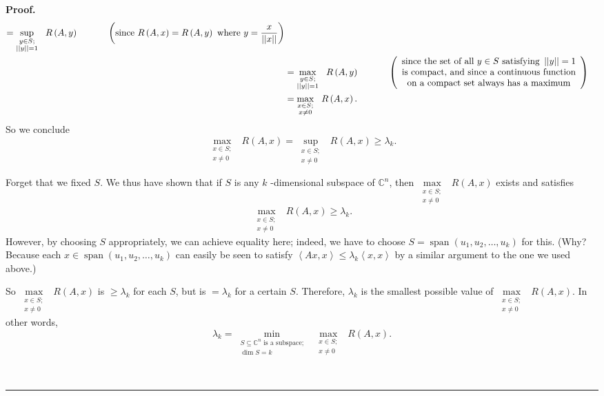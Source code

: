 \documentclass[numbers=enddot,12pt,final,onecolumn,notitlepage]{scrartcl}%
\numberwithin{exer}{subsection}
\theoremstyle{definition}
\newenvironment{proof}[1][Proof]{\noindent\textbf{#1.} }{\ \rule{0.5em}{0.5em}}
\begin{document}
\begin{proof}
\begin{align*}
=\sup\limits_{\substack{y\in S;\\\left\vert \left\vert y\right\vert
\right\vert =1}}\ \ R\left(  A,y\right)  \ \ \ \ \ \ \ \ \ \ \left(
\text{since }R\left(  A,x\right)  =R\left(  A,y\right)  \text{ where }%
y=\dfrac{x}{\left\vert \left\vert x\right\vert \right\vert }\right) \\
&  =\max\limits_{\substack{y\in S;\\\left\vert \left\vert y\right\vert
\right\vert =1}}\ \ R\left(  A,y\right)  \ \ \ \ \ \ \ \ \ \ \left(
\begin{array}
[c]{c}%
\text{since the set of all }y\in S\text{ satisfying }\left\vert \left\vert
y\right\vert \right\vert =1\\
\text{is compact, and since a continuous function}\\
\text{on a compact set always has a maximum}%
\end{array}
\right) \\
&  =\max\limits_{\substack{x\in S;\\x\neq0}}\ \ R\left(  A,x\right)  .
\end{align*}
So we conclude%
\[
\max\limits_{\substack{x\in S;\\x\neq0}}\ \ R\left(  A,x\right)
=\sup\limits_{\substack{x\in S;\\x\neq0}}\ \ R\left(  A,x\right)  \geq
\lambda_{k}.
\]


Forget that we fixed $S$. We thus have shown that if $S$ is any $k$%
-dimensional subspace of $\mathbb{C}^{n}$, then $\max\limits_{\substack{x\in
S;\\x\neq0}}\ \ R\left(  A,x\right)  $ exists and satisfies
\[
\max\limits_{\substack{x\in S;\\x\neq0}}\ \ R\left(  A,x\right)  \geq
\lambda_{k}.
\]
However, by choosing $S$ appropriately, we can achieve equality here; indeed,
we have to choose $S=\operatorname*{span}\left(  u_{1},u_{2},\ldots
,u_{k}\right)  $ for this. (Why? Because each $x\in\operatorname*{span}\left(
u_{1},u_{2},\ldots,u_{k}\right)  $ can easily be seen to satisfy $\left\langle
Ax,x\right\rangle \leq\lambda_{k}\left\langle x,x\right\rangle $ by a similar
argument to the one we used above.)

So $\max\limits_{\substack{x\in S;\\x\neq0}}\ \ R\left(  A,x\right)  $ is
$\geq\lambda_{k}$ for each $S$, but is $=\lambda_{k}$ for a certain $S$.
Therefore, $\lambda_{k}$ is the smallest possible value of $\max
\limits_{\substack{x\in S;\\x\neq0}}\ \ R\left(  A,x\right)  $. In other
words,%
\[
\lambda_{k}=\min\limits_{\substack{S\subseteq\mathbb{C}^{n}\text{ is a
subspace;}\\\dim S=k}}\ \ \max\limits_{\substack{x\in S;\\x\neq0}}\ \ R\left(
A,x\right)  .
\]



\end{proof}
\end{document}
